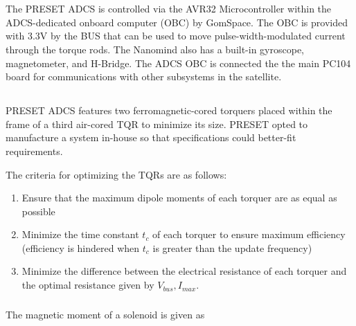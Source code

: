\documentclass{article}
\begin{document}
\newpage

\section{\color{black}{PRESET ADCS}}

\subsection{\color{black}{PRESET ADCS Hardware}}

The PRESET ADCS is controlled via the AVR32 Microcontroller within the ADCS-dedicated onboard computer (OBC) by GomSpace. The OBC is provided with 3.3V by the BUS that can be used to move pulse-width-modulated current through the torque rods. The Nanomind also has a built-in gyroscope, magnetometer, and H-Bridge. The ADCS OBC is connected the the main PC104 board for communications with other subsystems in the satellite.

\subsection{\color{black}{Custom Magnetorquers}}

PRESET ADCS features two ferromagnetic-cored torquers placed within the frame of a third air-cored TQR to minimize its size. PRESET opted to manufacture a system in-house so that specifications could better-fit requirements. 

The criteria for optimizing the TQRs are as follows:

\begin{enumerate}
    \item Ensure that the maximum dipole moments of each torquer are as equal as possible
    \item Minimize the time constant $t_{c}$ of each torquer to ensure maximum efficiency (efficiency is hindered when $t_{c}$ is greater than the update frequency)
    \item Minimize the difference between the electrical resistance of each torquer and the optimal resistance given by $V_{bus}, I_{max}$.
\end{enumerate}

\subsubsection{\color{black}{Air-Cored Magnetorquer}}

The magnetic moment of a solenoid is given as 
\end{document}
